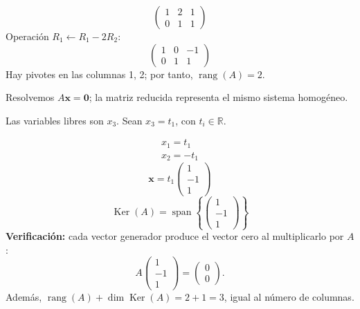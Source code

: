 \documentclass[12pt]{article}
\theoremstyle{remark}
\newcommand{\rang}{\operatorname{rang}}
\newcommand{\Ker}{\operatorname{Ker}}
\newcommand{\vect}[1]{\boldsymbol{#1}}
\begin{document}
\[
\begin{pmatrix}1&2&1\\0&1&1\end{pmatrix}
\]
Operación $R_{1}\leftarrow R_{1}-2R_{2}$:
\[
\begin{pmatrix}1&0&-1\\0&1&1\end{pmatrix}
\]
Hay pivotes en las columnas 1, 2; por tanto, $\boxed{\rang(A)=2}$.

Resolvemos $A\vect x=\vect0$; la matriz reducida representa el mismo sistema homogéneo.

Las variables libres son $x_{3}$. Sean $x_{3}=t_{1}$, con $t_i\in\mathbb R$.

\[
\begin{aligned}x_{1}=t_{1}\\x_{2}=- t_{1}\end{aligned}
\]
\[
\vect x=t_{1}\begin{pmatrix}1\\-1\\1\end{pmatrix}
\]
\[
\boxed{\Ker(A)=\operatorname{span}\left\{\begin{pmatrix}1\\-1\\1\end{pmatrix}\right\}}
\]
\textbf{Verificación:} cada vector generador produce el vector cero al multiplicarlo por $A$:
\[
A\begin{pmatrix}1\\-1\\1\end{pmatrix}=\begin{pmatrix}0\\0\end{pmatrix}.
\]
Además, $\rang(A)+\dim\Ker(A)=2+1=3$, igual al número de columnas.


\medskip
\end{document}
